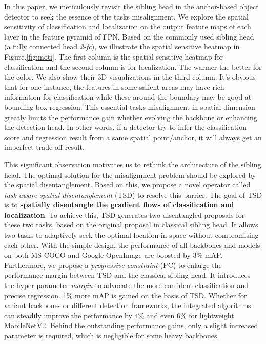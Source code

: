 \documentclass[10pt,twocolumn,letterpaper]{article}
\def \algfullname{\emph{task-aware spatial disentanglement}}
\def \algname{TSD}
\def \loss{PC}
\begin{document}
In this paper, we meticulously revisit the sibling head in the anchor-based object detector to seek the essence of the tasks misalignment.
We explore the spatial sensitivity of classification and localization on the output feature maps of each layer in the feature pyramid of FPN. Based on the commonly used sibling head (a fully connected head \emph{2-fc}), we illustrate the spatial sensitive heatmap in Figure.\ref{fig:moti}.
The first column is the spatial sensitive heatmap for classification and the second column is for localization. The warmer the better for the color. We also show their 3D visualizations in the third column.
It's obvious that for one instance, the features in some salient areas may have rich information for classification while these around the boundary may be good at bounding box regression.
This essential tasks misalignment in spatial dimension greatly limits the performance gain whether evolving the backbone or enhancing the detection head. In other words, if a detector try to infer the classification score and regression result from a same spatial point/anchor, it will always get an imperfect trade-off result.

This significant observation motivates us to rethink the architecture of the sibling head. The optimal solution for the misalignment problem should be explored by the spatial disentanglement. Based on this, we propose a novel operator called \algfullname{} (\algname{}) to resolve this barrier.
The goal of \algname{} is to \textbf{spatially disentangle the gradient flows of classification and localization}. To achieve this, \algname{} generates two disentangled proposals for these two tasks, based on the original proposal in classical sibling head.
It allows two tasks to adaptively seek the optimal location in space without compromising each other.
With the simple design, the performance of all backbones and models on both MS COCO and Google OpenImage are boosted by 3\% mAP. 
Furthermore, we propose a \emph{progressive constraint} (\loss{}) to enlarge the performance margin between \algname{} and the classical sibling head.
It introduces the hyper-parameter \emph{margin} to advocate the more confident classification and precise regression. 1\% more mAP is gained on the basis of \algname{}.
Whether for variant backbones or different detection frameworks, 
the integrated algorithms can steadily improve the performance by 4\% and even 6\% for lightweight MobileNetV2.
Behind the outstanding performance gains, only a slight increased parameter is required, which is negligible for some heavy backbones.
\end{document}
